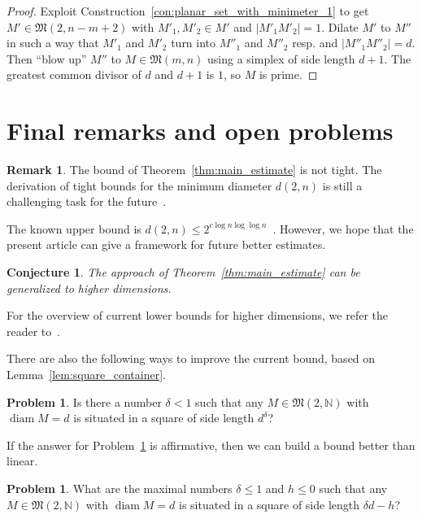 \documentclass[a4paper,14pt]{article} %
\theoremstyle{plain}
\newtheorem{conjecture}[theorem]{Conjecture}
\theoremstyle{definition}
\newtheorem{remark}[theorem]{Remark}
\newtheorem{problem}[theorem]{Problem}
\begin{document}
\begin{proof}
	Exploit Construction~\ref{con:planar_set_with_minimeter_1} to get $M'\in \mathfrak{M}(2,n-m+2)$
	with $M'_1, M'_2 \in M'$ and $|M'_1 M'_2| = 1$.
	Dilate $M'$ to $M''$ in such a way that $M'_1$ and $M'_2$ turn into $M''_1$ and $M''_2$ resp.
	and $|M''_1 M''_2| = d$.
	Then ``blow up'' $M''$ to $M\in \mathfrak{M}(m,n)$ using a simplex of side length $d+1$.
	The greatest common divisor of $d$ and $d+1$ is $1$, so $M$ is prime.
\end{proof}


\section{Final remarks and open problems}

\begin{remark}
	The bound of Theorem~\ref{thm:main_estimate} is not tight.
	The derivation of tight bounds for the minimum diameter $d(2, n)$
	is still a challenging task for the future~\cite[Section 7]{kurz2008minimum}.
\end{remark}
The known upper bound is $d(2,n)\leq 2^{c \log n \log \log n}$~\cite{harborth1993upper}.
However, we hope that the present article can give a framework for future better estimates.

\begin{conjecture}
	The approach of Theorem~\ref{thm:main_estimate} can be generalized to higher dimensions.
\end{conjecture}
For the overview of current lower bounds for higher dimensions, we refer the reader to~\cite{nozaki2013lower}.

There are also the following ways to improve the current bound,
based on Lemma~\ref{lem:square_container}.

\begin{problem}
	\label{prb:square_side_length_and_diameter_power}
	Is there a number $\delta < 1$ such that any $M\in\mathfrak{M}(2,\mathbb{N})$ with $\operatorname{diam} M = d$
	is situated in a square of side length $d^\delta$?
\end{problem}
If the answer for Problem~\ref{prb:square_side_length_and_diameter_power} is affirmative,
then we can build a bound better than linear.

\begin{problem}
	\label{prb:square_side_length_and_diameter_linear}
	What are the maximal numbers $\delta \leq 1$ and $h \leq 0$
	such that any $M\in\mathfrak{M}(2,\mathbb{N})$ with $\operatorname{diam} M = d$
	is situated in a square of side length $\delta d - h$?
\end{problem}
\end{document}
